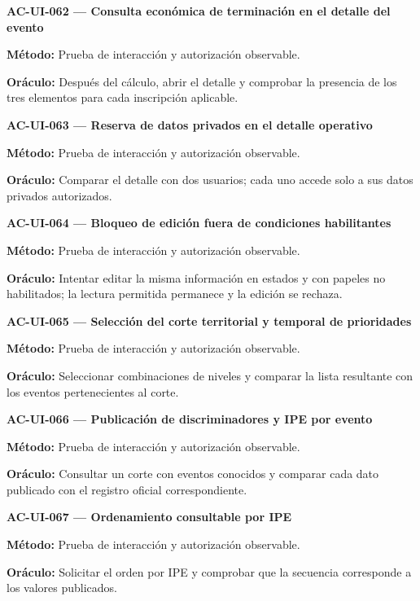 \documentclass[10pt,letterpaper]{article}
\begin{document}
\noindent\textbf{AC-UI-062 --- Consulta económica de terminación en el detalle del evento}\par
\textbf{Método:} Prueba de interacción y autorización observable.\par
\textbf{Oráculo:} Después del cálculo, abrir el detalle y comprobar la presencia de los tres elementos para cada inscripción aplicable.\par\vspace{0.45em}
\noindent\textbf{AC-UI-063 --- Reserva de datos privados en el detalle operativo}\par
\textbf{Método:} Prueba de interacción y autorización observable.\par
\textbf{Oráculo:} Comparar el detalle con dos usuarios; cada uno accede solo a sus datos privados autorizados.\par\vspace{0.45em}
\noindent\textbf{AC-UI-064 --- Bloqueo de edición fuera de condiciones habilitantes}\par
\textbf{Método:} Prueba de interacción y autorización observable.\par
\textbf{Oráculo:} Intentar editar la misma información en estados y con papeles no habilitados; la lectura permitida permanece y la edición se rechaza.\par\vspace{0.45em}
\noindent\textbf{AC-UI-065 --- Selección del corte territorial y temporal de prioridades}\par
\textbf{Método:} Prueba de interacción y autorización observable.\par
\textbf{Oráculo:} Seleccionar combinaciones de niveles y comparar la lista resultante con los eventos pertenecientes al corte.\par\vspace{0.45em}
\noindent\textbf{AC-UI-066 --- Publicación de discriminadores y IPE por evento}\par
\textbf{Método:} Prueba de interacción y autorización observable.\par
\textbf{Oráculo:} Consultar un corte con eventos conocidos y comparar cada dato publicado con el registro oficial correspondiente.\par\vspace{0.45em}
\noindent\textbf{AC-UI-067 --- Ordenamiento consultable por IPE}\par
\textbf{Método:} Prueba de interacción y autorización observable.\par
\textbf{Oráculo:} Solicitar el orden por IPE y comprobar que la secuencia corresponde a los valores publicados.\par\vspace{0.45em}
\end{document}
